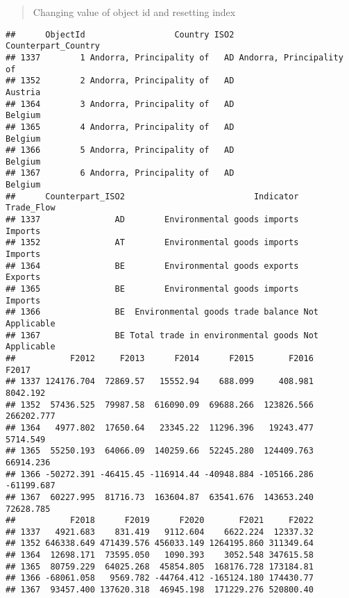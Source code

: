 \documentclass[
]{article}
\newenvironment{Shaded}{\begin{snugshade}}{\end{snugshade}}
\newcommand{\DecValTok}[1]{\textcolor[rgb]{0.00,0.00,0.81}{#1}}
\newcommand{\FunctionTok}[1]{\textcolor[rgb]{0.00,0.00,0.00}{#1}}
\newcommand{\NormalTok}[1]{#1}
\newcommand{\OtherTok}[1]{\textcolor[rgb]{0.56,0.35,0.01}{#1}}
\newcommand{\SpecialCharTok}[1]{\textcolor[rgb]{0.00,0.00,0.00}{#1}}
\begin{document}
\begin{quote}
Changing value of object id and resetting index
\end{quote}

\begin{Shaded}
\end{Shaded}

\begin{verbatim}
##      ObjectId                  Country ISO2      Counterpart_Country
## 1337        1 Andorra, Principality of   AD Andorra, Principality of
## 1352        2 Andorra, Principality of   AD                  Austria
## 1364        3 Andorra, Principality of   AD                  Belgium
## 1365        4 Andorra, Principality of   AD                  Belgium
## 1366        5 Andorra, Principality of   AD                  Belgium
## 1367        6 Andorra, Principality of   AD                  Belgium
##      Counterpart_ISO2                          Indicator     Trade_Flow
## 1337               AD        Environmental goods imports        Imports
## 1352               AT        Environmental goods imports        Imports
## 1364               BE        Environmental goods exports        Exports
## 1365               BE        Environmental goods imports        Imports
## 1366               BE  Environmental goods trade balance Not Applicable
## 1367               BE Total trade in environmental goods Not Applicable
##           F2012     F2013      F2014      F2015       F2016      F2017
## 1337 124176.704  72869.57   15552.94    688.099     408.981   8042.192
## 1352  57436.525  79987.58  616090.09  69688.266  123826.566 266202.777
## 1364   4977.802  17650.64   23345.22  11296.396   19243.477   5714.549
## 1365  55250.193  64066.09  140259.66  52245.280  124409.763  66914.236
## 1366 -50272.391 -46415.45 -116914.44 -40948.884 -105166.286 -61199.687
## 1367  60227.995  81716.73  163604.87  63541.676  143653.240  72628.785
##           F2018      F2019      F2020       F2021     F2022
## 1337   4921.683    831.419   9112.604    6622.224  12337.32
## 1352 646338.649 471439.576 456033.149 1264195.860 311349.64
## 1364  12698.171  73595.050   1090.393    3052.548 347615.58
## 1365  80759.229  64025.268  45854.805  168176.728 173184.81
## 1366 -68061.058   9569.782 -44764.412 -165124.180 174430.77
## 1367  93457.400 137620.318  46945.198  171229.276 520800.40
\end{verbatim}
\end{document}
